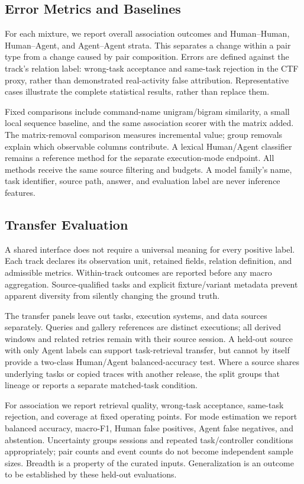 \documentclass[10pt]{article}
\begin{document}
\subsection{Error Metrics and Baselines}
For each mixture, we report overall association outcomes and Human--Human, Human--Agent, and Agent--Agent strata. This separates a change within a pair type from a change caused by pair composition. Errors are defined against the track's relation label: wrong-task acceptance and same-task rejection in the CTF proxy, rather than demonstrated real-activity false attribution. Representative cases illustrate the complete statistical results, rather than replace them.

Fixed comparisons include command-name unigram/bigram similarity, a small local sequence baseline, and the same association scorer with the matrix added. The matrix-removal comparison measures incremental value; group removals explain which observable columns contribute. A lexical Human/Agent classifier remains a reference method for the separate execution-mode endpoint. All methods receive the same source filtering and budgets. A model family's name, task identifier, source path, answer, and evaluation label are never inference features.

\subsection{Transfer Evaluation}
A shared interface does not require a universal meaning for every positive label. Each track declares its observation unit, retained fields, relation definition, and admissible metrics. Within-track outcomes are reported before any macro aggregation. Source-qualified tasks and explicit fixture/variant metadata prevent apparent diversity from silently changing the ground truth.

The transfer panels leave out tasks, execution systems, and data sources separately. Queries and gallery references are distinct executions; all derived windows and related retries remain with their source session. A held-out source with only Agent labels can support task-retrieval transfer, but cannot by itself provide a two-class Human/Agent balanced-accuracy test. Where a source shares underlying tasks or copied traces with another release, the split groups that lineage or reports a separate matched-task condition.

For association we report retrieval quality, wrong-task acceptance, same-task rejection, and coverage at fixed operating points. For mode estimation we report balanced accuracy, macro-F1, Human false positives, Agent false negatives, and abstention. Uncertainty groups sessions and repeated task/controller conditions appropriately; pair counts and event counts do not become independent sample sizes. Breadth is a property of the curated inputs. Generalization is an outcome to be established by these held-out evaluations.
\end{document}
